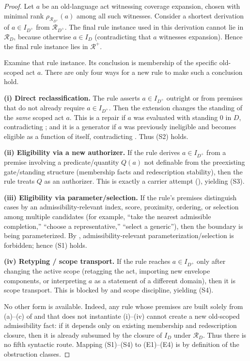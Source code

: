 \documentclass[11pt]{article}
\theoremstyle{definition}
\begin{document}
\begin{proof}
Let $a$ be an old-language act witnessing coverage expansion, chosen with minimal rank $\rho_{\mathcal{R}_{D^+}}(a)$ among all such witnesses.
Consider a shortest derivation of $a\in I_{D^+}$ from $\mathcal{R}_{D^+}$.
The final rule instance used in this derivation cannot lie in $\mathcal{R}_D$, because otherwise $a\in I_D$ (contradicting that $a$ witnesses expansion).
Hence the final rule instance lies in $\mathcal{R}^+$.

Examine that rule instance.
Its conclusion is membership of the specific old-scoped act $a$.
There are only four ways for a new rule to make such a conclusion hold.

\textbf{(i) Direct reclassification.}
The rule asserts $a\in I_{D^+}$ outright or from premises that do not already require $a\in I_{D^+}$.
Then the extension changes the standing of the \emph{same} scoped act $a$.
This is a repair if $a$ was evaluated with standing $0$ in $D$, contradicting ; and it is a generator if $a$ was previously ineligible and becomes eligible as a function of itself, contradicting .
Thus (S2) holds.

\textbf{(ii) Eligibility via a new authorizer.}
If the rule derives $a\in I_{D^+}$ from a premise involving a predicate/quantity $Q(a)$ not definable from the preexisting gate/standing structure (membership facts and redescription stability), then the rule treats $Q$ as an authorizer.
This is exactly a carrier attempt (), yielding (S3).

\textbf{(iii) Eligibility via parameter/selection.}
If the rule's premises distinguish cases by an admissibility-relevant index, score, proximity, ordering, or selection among multiple candidates (for example, ``take the nearest admissible completion,'' ``choose a representative,'' ``select a generic''), then the boundary is being parameterized.
By , admissibility-relevant parameterization/selection is forbidden; hence (S1) holds.

\textbf{(iv) Retyping / scope transport.}
If the rule reaches $a\in I_{D^+}$ only after changing the active scope (retagging the act, importing new envelope components, or interpreting $a$ as a statement of a different domain), then it is scope transport.
This is blocked by  and scope discipline, yielding (S4).

No other form is available.
Indeed, any rule whose premises are built solely from (a)--(c) of  and that does not instantiate (i)--(iv) cannot create a new old-scoped admissibility fact: if it depends only on existing membership and redescription closure, then it is already subsumed by the closure of $I_D$ under $\mathcal{R}_D$.
Thus there is no fifth syntactic route.
Mapping (S1)--(S4) to (E1)--(E4) is by definition of the obstruction classes.
\end{proof}
\end{document}
